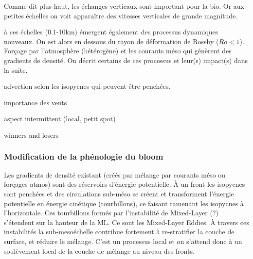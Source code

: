 \begin{figure}
  \centering
  \label{fig:nutrient-upwell}
\end{figure}

Comme dit plus haut, les échanges verticaux sont important pour la bio.
Or aux petites échelles on voit apparaître des vitesses verticales de grande magnitude.

à ces échelles (0.1-10km) émergent également des processus dynamiques nouveaux.
On est alors en dessous du rayon de déformation de Rossby (\(Ro < 1\)).
Forçage par l'atmosphère (hétérogène) et les courants méso qui génèrent des gradients de densité.
On décrit certains de ces processus et leur(s) impact(s) dans la suite.

advection selon les isopycnes qui peuvent être penchées.

importance des vents

aspect intermittent (local, petit spot)

winners and losers


\subsubsection{Modification de la phénologie du bloom}
\label{sec:modif-phenologie}

Les gradients de densité existant (créés par mélange par courants méso ou forçages atmos) sont des réservoirs d'énergie potentielle. À un front les isopycnes sont penchées et des circulations sub-méso se créent et transforment l'énergie potentielle en énergie cinétique (tourbillons), ce faisant ramenant les isopycnes à l'horizontale.
Ces tourbillons formés par l'instabilité de Mixed-Layer (?) s'étendent sur la hauteur de la ML. Ce sont les Mixed-Layer Eddies.
À travers ces instabilités la sub-mesoéchelle contribue fortement à re-stratifier la couche  de surface, et réduire le mélange.
C'est un processus local et on s'attend donc à un soulèvement local de la couche de mélange au niveau des fronts.


